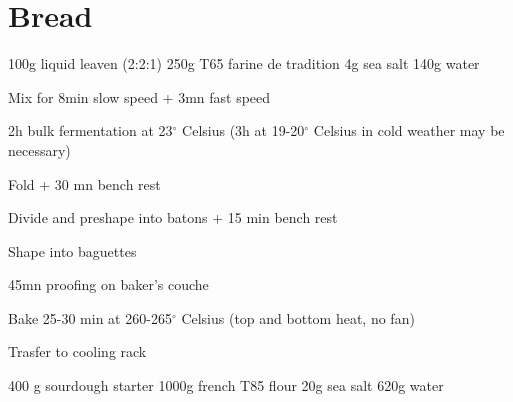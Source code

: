 \chapter{Bread}
\minitoc

\label{rec:bread-baguette}

\begin{ingreds}
	100g liquid leaven (2:2:1)
	250g T65 farine de tradition
	4g sea salt
	140g water

\end{ingreds}

\begin{method}
Mix for 8min slow speed + 3mn fast speed

2h bulk fermentation at 23$^{\circ}$ Celsius (3h at 19-20$^{\circ}$ Celsius in cold weather may be necessary)

Fold + 30 mn bench rest

Divide and preshape into batons + 15 min bench rest

Shape into baguettes

45mn proofing on baker's couche

Bake 25-30 min at 260-265$^{\circ}$ Celsius (top and bottom heat, no fan)

Trasfer to cooling rack

\end {method}

\label{rec:bread-campagne}

\begin{ingreds}
	400 g sourdough starter
	1000g french T85 flour
	20g sea salt
	620g water
\end{ingreds}

